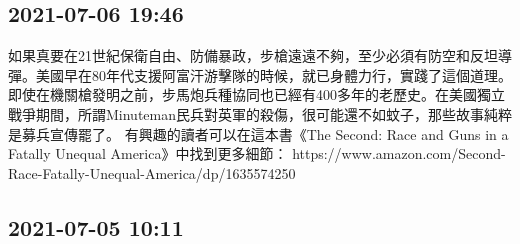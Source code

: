 \documentclass[twocolumn]{ctexart}
\begin{document}
\subsection*{2021-07-06 19:46}

如果真要在21世紀保衛自由、防備暴政，步槍遠遠不夠，至少必須有防空和反坦導彈。美國早在80年代支援阿富汗游擊隊的時候，就已身體力行，實踐了這個道理。即使在機關槍發明之前，步馬炮兵種協同也已經有400多年的老歷史。在美國獨立戰爭期間，所謂Minuteman民兵對英軍的殺傷，很可能還不如蚊子，那些故事純粹是募兵宣傳罷了。
有興趣的讀者可以在這本書《The Second: Race and Guns in a Fatally Unequal America》中找到更多細節：
https://www.amazon.com/Second-Race-Fatally-Unequal-America/dp/1635574250
\subsection*{2021-07-05 10:11}
\end{document}
